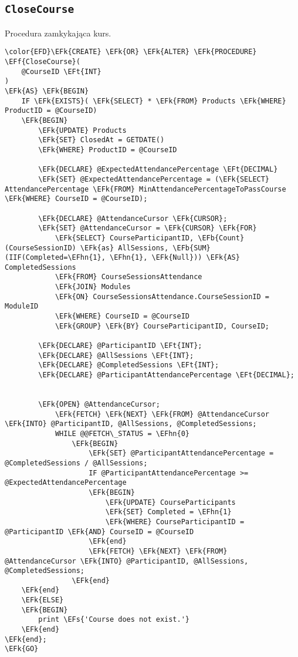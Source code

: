 \documentclass[11pt]{article}
\newcommand{\EFs}[1]{\textcolor{EFs}{#1}} %
\newcommand{\EFk}[1]{\textcolor{EFk}{\textbf{#1}}} %
\newcommand{\EFb}[1]{\textcolor{EFb}{\textbf{#1}}} %
\newcommand{\EFf}[1]{\textcolor{EFf}{#1}} %
\newcommand{\EFt}[1]{\textcolor{EFt}{\textbf{#1}}} %
\newcommand{\EFhn}[1]{\textcolor{EFhn}{#1}} %
\begin{document}
\subsection{\texttt{CloseCourse}}
\label{sec:orgb8e8734}
Procedura zamkykająca kurs.
\begin{Code}
\begin{Verbatim}
\color{EFD}\EFk{CREATE} \EFk{OR} \EFk{ALTER} \EFk{PROCEDURE} \EFf{CloseCourse}(
    @CourseID \EFt{INT}
)
\EFk{AS} \EFk{BEGIN}
    IF \EFk{EXISTS}( \EFk{SELECT} * \EFk{FROM} Products \EFk{WHERE} ProductID = @CourseID)
    \EFk{BEGIN}
        \EFk{UPDATE} Products
        \EFk{SET} ClosedAt = GETDATE()
        \EFk{WHERE} ProductID = @CourseID

        \EFk{DECLARE} @ExpectedAttendancePercentage \EFt{DECIMAL}
        \EFk{SET} @ExpectedAttendancePercentage = (\EFk{SELECT} AttendancePercentage \EFk{FROM} MinAttendancePercentageToPassCourse \EFk{WHERE} CourseID = @CourseID);

        \EFk{DECLARE} @AttendanceCursor \EFk{CURSOR};
        \EFk{SET} @AttendanceCursor = \EFk{CURSOR} \EFk{FOR}
            \EFk{SELECT} CourseParticipantID, \EFb{Count}(CourseSessionID) \EFk{as} AllSessions, \EFb{SUM}(IIF(Completed=\EFhn{1}, \EFhn{1}, \EFk{Null})) \EFk{AS} CompletedSessions
            \EFk{FROM} CourseSessionsAttendance
            \EFk{JOIN} Modules
            \EFk{ON} CourseSessionsAttendance.CourseSessionID = ModuleID
            \EFk{WHERE} CourseID = @CourseID
            \EFk{GROUP} \EFk{BY} CourseParticipantID, CourseID;

        \EFk{DECLARE} @ParticipantID \EFt{INT};
        \EFk{DECLARE} @AllSessions \EFt{INT};
        \EFk{DECLARE} @CompletedSessions \EFt{INT};
        \EFk{DECLARE} @ParticipantAttendancePercentage \EFt{DECIMAL};


        \EFk{OPEN} @AttendanceCursor;
            \EFk{FETCH} \EFk{NEXT} \EFk{FROM} @AttendanceCursor \EFk{INTO} @ParticipantID, @AllSessions, @CompletedSessions;
            WHILE @@FETCH\_STATUS = \EFhn{0}
                \EFk{BEGIN}
                    \EFk{SET} @ParticipantAttendancePercentage = @CompletedSessions / @AllSessions;
                    IF @ParticipantAttendancePercentage >= @ExpectedAttendancePercentage
                    \EFk{BEGIN}
                        \EFk{UPDATE} CourseParticipants
                        \EFk{SET} Completed = \EFhn{1}
                        \EFk{WHERE} CourseParticipantID = @ParticipantID \EFk{AND} CourseID = @CourseID
                    \EFk{end}
                    \EFk{FETCH} \EFk{NEXT} \EFk{FROM} @AttendanceCursor \EFk{INTO} @ParticipantID, @AllSessions, @CompletedSessions;
                \EFk{end}
    \EFk{end}
    \EFk{ELSE}
    \EFk{BEGIN}
        print \EFs{'Course does not exist.'}
    \EFk{end}
\EFk{end};
\EFk{GO}
\end{Verbatim}
\end{Code}
\end{document}
